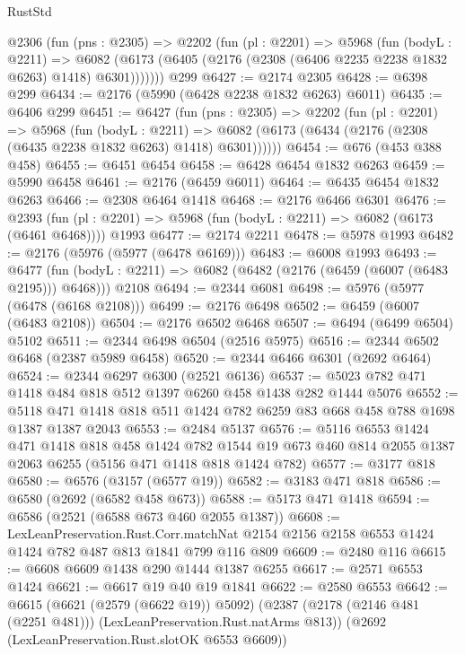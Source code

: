 \begin{lexlean}{RustStd}
\begin{coremodule}
{\begin{coremodule}
{{{{{{{{{{    @2306
      (fun (pns : @2305) =>
      @2202
        (fun (pl : @2201) =>
        @5968
          (fun (bodyL : @2211) =>
          @6082 (@6173 (@6405 (@2176 (@2308 (@6406 @2235 @2238 @1832 @6263) @1418) @6301)))))))
    @299
@6427 := @2174 @2305
@6428 := @6398 @299
@6434 := @2176 (@5990 (@6428 @2238 @1832 @6263) @6011)
@6435 := @6406 @299
@6451 := @6427
    (fun (pns : @2305) =>
    @2202
      (fun (pl : @2201) =>
      @5968
        (fun (bodyL : @2211) =>
        @6082 (@6173 (@6434 (@2176 (@2308 (@6435 @2238 @1832 @6263) @1418) @6301))))))
@6454 := @676 (@453 @388 @458)
@6455 := @6451 @6454
@6458 := @6428 @6454 @1832 @6263
@6459 := @5990 @6458
@6461 := @2176 (@6459 @6011)
@6464 := @6435 @6454 @1832 @6263
@6466 := @2308 @6464 @1418
@6468 := @2176 @6466 @6301
@6476 := @2393
    (fun (pl : @2201) => @5968 (fun (bodyL : @2211) => @6082 (@6173 (@6461 @6468))))
    @1993
@6477 := @2174 @2211
@6478 := @5978 @1993
@6482 := @2176 (@5976 (@5977 (@6478 @6169)))
@6483 := @6008 @1993
@6493 := @6477
    (fun (bodyL : @2211) => @6082 (@6482 (@2176 (@6459 (@6007 (@6483 @2195))) @6468)))
    @2108
@6494 := @2344 @6081
@6498 := @5976 (@5977 (@6478 (@6168 @2108)))
@6499 := @2176 @6498
@6502 := @6459 (@6007 (@6483 @2108))
@6504 := @2176 @6502 @6468
@6507 := @6494 (@6499 @6504) @5102
@6511 := @2344 @6498 @6504 (@2516 @5975)
@6516 := @2344 @6502 @6468 (@2387 @5989 @6458)
@6520 := @2344 @6466 @6301 (@2692 @6464)
@6524 := @2344 @6297 @6300 (@2521 @6136)
@6537 := @5023 @782 @471 @1418 @484 @818 @512 @1397 @6260 @458 @1438 @282 @1444 @5076
@6552 := @5118 @471 @1418 @818 @511 @1424 @782 @6259 @83 @668 @458 @788 @1698 @1387 @1387 @2043
@6553 := @2484 @5137
@6576 := @5116
    @6553
    @1424
    @471
    @1418
    @818
    @458
    @1424
    @782
    @1544
    @19
    @673
    @460
    @814
    @2055
    @1387
    @2063
    @6255
    (@5156 @471 @1418 @818 @1424 @782)
@6577 := @3177 @818
@6580 := @6576 (@3157 (@6577 @19))
@6582 := @3183 @471 @818
@6586 := @6580 (@2692 (@6582 @458 @673))
@6588 := @5173 @471 @1418
@6594 := @6586 (@2521 (@6588 @673 @460 @2055 @1387))
@6608 := LexLeanPreservation.Rust.Corr.matchNat
    @2154
    @2156
    @2158
    @6553
    @1424
    @1424
    @782
    @487
    @813
    @1841
    @799
    @116
    @809
@6609 := @2480 @116
@6615 := @6608 @6609 @1438 @290 @1444 @1387 @6255
@6617 := @2571 @6553 @1424
@6621 := @6617 @19 @40 @19 @1841
@6622 := @2580 @6553
@6642 := @6615
    (@6621 (@2579 (@6622 @19)) @5092)
    (@2387 (@2178 (@2146 @481 (@2251 @481))) (LexLeanPreservation.Rust.natArms @813))
    (@2692 (LexLeanPreservation.Rust.slotOK @6553 @6609))
}}}}}}}}}}
\end{coremodule}}
\end{coremodule}
\end{lexlean}
